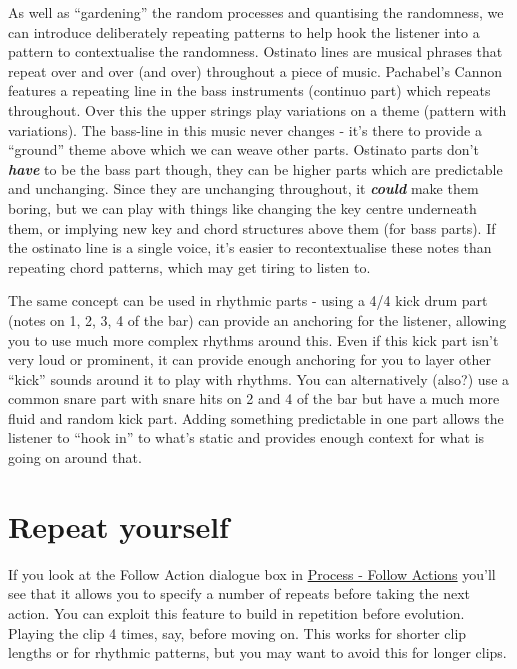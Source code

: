 \documentclass[
  12pt,
  letterpaper,
  oneside,
  open=any]{scrbook}
\begin{document}
As well as ``gardening'' the random processes and quantising the
randomness, we can introduce deliberately repeating patterns to help
hook the listener into a pattern to contextualise the randomness.
Ostinato lines are musical phrases that repeat over and over (and over)
throughout a piece of music. Pachabel's Cannon features a repeating line
in the bass instruments (continuo part) which repeats throughout. Over
this the upper strings play variations on a theme (pattern with
variations). The bass-line in this music never changes - it's there to
provide a ``ground'' theme above which we can weave other parts.
Ostinato parts don't \textbf{\emph{have}} to be the bass part though,
they can be higher parts which are predictable and unchanging. Since
they are unchanging throughout, it \textbf{\emph{could}} make them
boring, but we can play with things like changing the key centre
underneath them, or implying new key and chord structures above them
(for bass parts). If the ostinato line is a single voice, it's easier to
recontextualise these notes than repeating chord patterns, which may get
tiring to listen to.

The same concept can be used in rhythmic parts - using a 4/4 kick drum
part (notes on 1, 2, 3, 4 of the bar) can provide an anchoring for the
listener, allowing you to use much more complex rhythms around this.
Even if this kick part isn't very loud or prominent, it can provide
enough anchoring for you to layer other ``kick'' sounds around it to
play with rhythms. You can alternatively (also?) use a common snare part
with snare hits on 2 and 4 of the bar but have a much more fluid and
random kick part. Adding something predictable in one part allows the
listener to ``hook in'' to what's static and provides enough context for
what is going on around that.

\section{Repeat yourself}\label{repeat-yourself}

If you look at the Follow Action dialogue box in
\hyperref[Chapter-003-Process-Follow_Actions]{Process - Follow Actions}
you'll see that it allows you to specify a number of repeats before
taking the next action. You can exploit this feature to build in
repetition before evolution. Playing the clip 4 times, say, before
moving on. This works for shorter clip lengths or for rhythmic patterns,
but you may want to avoid this for longer clips.
\end{document}
